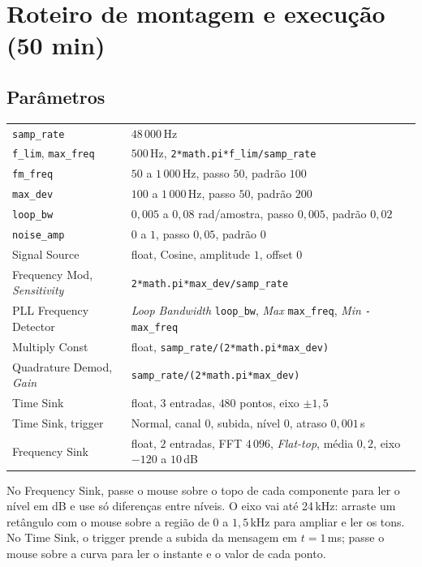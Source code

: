 \documentclass[11pt,a4paper]{article}
\begin{document}
\section{Roteiro de montagem e execução (50 min)}

\subsection*{Parâmetros}

\begin{center}\small
\begin{tabular}{l l}
  \toprule
  \texttt{samp\_rate} & $48\,000$\,Hz \\
  \texttt{f\_lim}, \texttt{max\_freq} & $500$\,Hz, \texttt{2*math.pi*f\_lim/samp\_rate} \\
  \texttt{fm\_freq} & $50$ a $1\,000$\,Hz, passo $50$, padrão $100$ \\
  \texttt{max\_dev} & $100$ a $1\,000$\,Hz, passo $50$, padrão $200$ \\
  \texttt{loop\_bw} & $0{,}005$ a $0{,}08$ rad/amostra, passo $0{,}005$, padrão $0{,}02$ \\
  \texttt{noise\_amp} & $0$ a $1$, passo $0{,}05$, padrão $0$ \\
  Signal Source & float, Cosine, amplitude $1$, offset $0$ \\
  Frequency Mod, \textit{Sensitivity} & \texttt{2*math.pi*max\_dev/samp\_rate} \\
  PLL Frequency Detector & \textit{Loop Bandwidth} \texttt{loop\_bw}, \textit{Max} \texttt{max\_freq}, \textit{Min} \texttt{-max\_freq} \\
  Multiply Const & float, \texttt{samp\_rate/(2*math.pi*max\_dev)} \\
  Quadrature Demod, \textit{Gain} & \texttt{samp\_rate/(2*math.pi*max\_dev)} \\
  Time Sink & float, $3$ entradas, $480$ pontos, eixo $\pm 1{,}5$ \\
  Time Sink, trigger & Normal, canal $0$, subida, nível $0$, atraso $0{,}001$\,s \\
  Frequency Sink & float, $2$ entradas, FFT $4\,096$, \textit{Flat-top}, média $0{,}2$, eixo $-120$ a $10$\,dB \\
  \bottomrule
\end{tabular}
\end{center}

\begin{instrucao}
No Frequency Sink, passe o mouse sobre o topo de cada componente para ler o
nível em dB e use só diferenças entre níveis. O eixo vai até 24\,kHz: arraste um retângulo com o mouse sobre a região de $0$ a $1{,}5$\,kHz para ampliar e ler os tons. No Time Sink, o trigger prende a
subida da mensagem em $t = 1$\,ms; passe o mouse sobre a curva para ler o
instante e o valor de cada ponto.
\end{instrucao}
\end{document}
